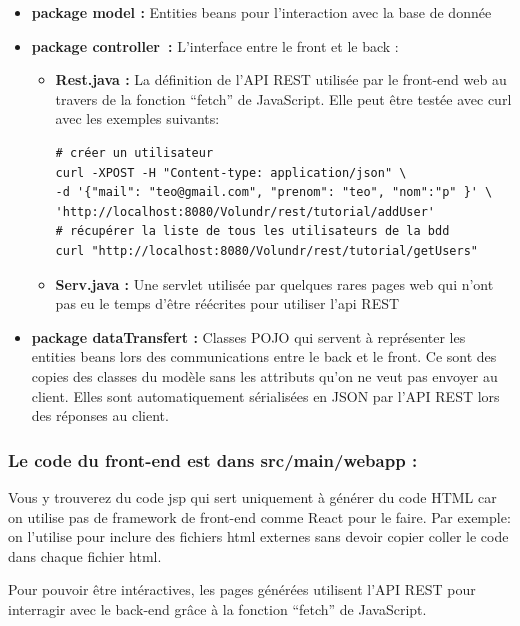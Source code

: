 \documentclass[french]{article}
\providecommand{\tightlist}{%
  \setlength{\itemsep}{0pt}\setlength{\parskip}{0pt}}
\begin{document}
\begin{itemize}
\tightlist
\item
  \textbf{package model :} Entities beans pour l'interaction avec la base de
  donnée
\item
  \textbf{package controller~:} L'interface entre le front et le back :

  \begin{itemize}
  \tightlist
  \item
    \textbf{Rest.java :} La définition de l'API REST utilisée par le front-end
    web au travers de la fonction ``fetch'' de JavaScript. Elle peut
    être testée avec curl avec les exemples suivants:
 \begin{verbatim}
# créer un utilisateur
curl -XPOST -H "Content-type: application/json" \
-d '{"mail": "teo@gmail.com", "prenom": "teo", "nom":"p" }' \
'http://localhost:8080/Volundr/rest/tutorial/addUser'
# récupérer la liste de tous les utilisateurs de la bdd
curl "http://localhost:8080/Volundr/rest/tutorial/getUsers"
\end{verbatim}
\item
    \textbf{Serv.java :} Une servlet utilisée par quelques rares pages web qui
    n'ont pas eu le temps d'être réécrites pour utiliser l'api REST
  \end{itemize}

\item
  \textbf{package dataTransfert :} Classes POJO qui servent à représenter les
  entities beans lors des communications entre le back et le front. Ce
  sont des copies des classes du modèle sans les attributs qu'on ne veut
  pas envoyer au client. Elles sont automatiquement sérialisées en JSON
  par l'API REST lors des réponses au client.

\end{itemize}

\subsubsection{Le code du front-end est dans src/main/webapp :}

Vous y trouverez du code jsp qui sert uniquement à générer du code HTML
car on utilise pas de framework de front-end comme React pour le faire. Par exemple: on l'utilise pour
inclure des fichiers html externes sans devoir copier coller le code
dans chaque fichier html.

Pour pouvoir être intéractives, les pages générées utilisent l'API REST
pour interragir avec le back-end grâce à la fonction ``fetch'' de
JavaScript.
\end{document}

